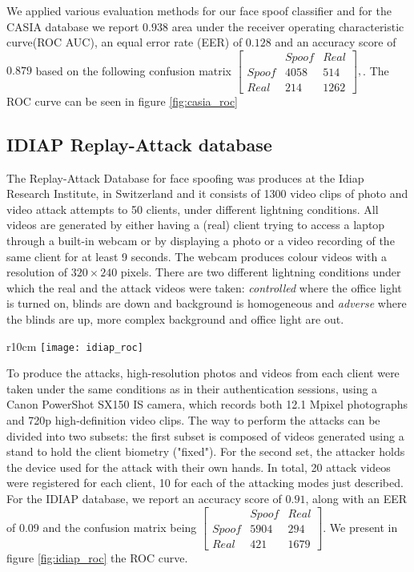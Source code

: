 We applied various evaluation methods for our face spoof classifier and for the CASIA database we report $0.938$ area under the receiver operating characteristic curve(ROC AUC), an equal error rate (EER) of $0.128$ and an accuracy score of $0.879$ based on the following confusion matrix
$
[
\begin{smallmatrix}
&Spoof & Real\\
Spoof & 4058 & 514\\
Real & 214 & 1262
\end{smallmatrix}], 
$. The ROC curve can be seen in figure \ref{fig:casia_roc}
\subsection{IDIAP Replay-Attack database}
The Replay-Attack Database for face spoofing was produces at the Idiap Research Institute, in Switzerland and it consists of 1300 video clips of photo and video attack attempts to 50 clients, under different lightning conditions. All videos are generated by either having a (real) client trying to access a laptop through a built-in webcam or by displaying a photo or a video recording of the same client for at least 9 seconds. The webcam produces colour videos with a resolution of $320\times240$ pixels. 
There are two different lightning conditions under which the real and the attack videos were taken: \textit{controlled} where the office light is turned on, blinds are down and background is homogeneous and \textit{adverse} where the blinds are up, more complex background and office light are out. 
\begin{wrapfigure}{r}{10cm}
	\captionsetup{width=10cm,font=small}
	\centering
	\texttt{[image: idiap\_roc]}
	\caption[IDIAP database resulted ROC curve]{The resulted receiver operating characteristic curve for the IDIAP database corresponding to our implementation of a face spoof validator based on uniform LBP and linear SVM}
	\label{fig:idiap_roc}
\end{wrapfigure}
To produce the attacks, high-resolution photos and videos from each client were taken under the same conditions as in their authentication sessions, using a Canon PowerShot SX150 IS camera, which records both 12.1 Mpixel photographs and 720p high-definition video clips. The way to perform the attacks can be divided into two subsets: the first subset is composed of videos generated using a stand to hold the client biometry ("fixed"). For the second set, the attacker holds the device used for the attack with their own hands. In total, 20 attack videos were registered for each client, 10 for each of the attacking modes just described.
For the IDIAP database, we report an accuracy score of $0.91$, along with an EER of 0.09 and the confusion matrix being 
$
[
\begin{smallmatrix}
&Spoof & Real\\
Spoof & 5904 & 294\\
Real & 421 & 1679
\end{smallmatrix}] 
$. We present in figure \ref{fig:idiap_roc} the ROC curve.

